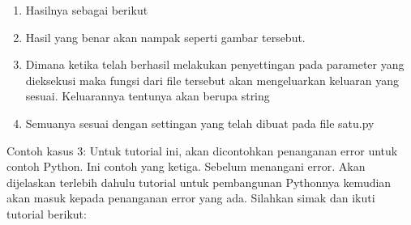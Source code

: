 \begin{enumerate}
\item Hasilnya sebagai berikut 
\item Hasil yang benar akan nampak seperti gambar tersebut.
\item Dimana ketika telah berhasil melakukan penyettingan pada parameter yang dieksekusi maka fungsi dari file tersebut akan mengeluarkan keluaran yang sesuai. Keluarannya tentunya akan berupa string
\item Semuanya sesuai dengan settingan yang telah dibuat pada file satu.py
\end{enumerate}

Contoh kasus 3: Untuk tutorial ini, akan dicontohkan penanganan error untuk contoh Python. Ini contoh yang ketiga. Sebelum menangani error. Akan dijelaskan terlebih dahulu tutorial untuk pembangunan Pythonnya kemudian akan masuk kepada penanganan error yang ada. Silahkan simak dan ikuti tutorial berikut: 
